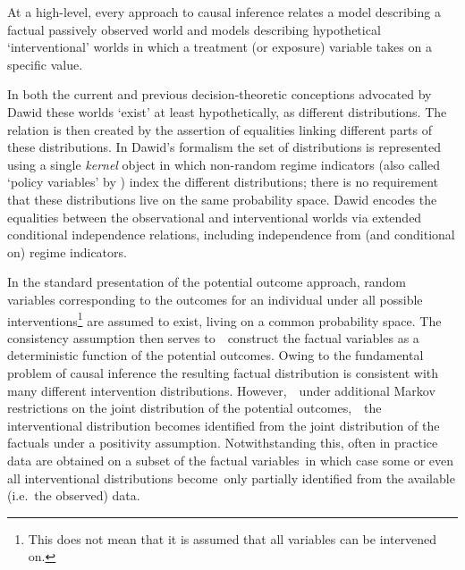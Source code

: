 \documentclass[11pt]{article}
\begin{document}
At a high-level, every approach to causal inference relates a model describing a factual passively observed world and models describing hypothetical `interventional' worlds in which a treatment (or exposure) variable takes on a specific value. 

In both the current and previous decision-theoretic conceptions advocated by Dawid these worlds `exist' at least hypothetically, as different distributions. The relation is then created by the assertion of equalities linking different parts of these distributions. In Dawid's formalism the  set of distributions is represented using a single {\it kernel} object in which non-random regime indicators (also called `policy variables' by \citet{sgs:1993}) index the different distributions; there is no requirement that these distributions live on the same probability space.
Dawid encodes the equalities between the observational and interventional worlds via extended conditional independence relations, including independence from (and conditional on) regime indicators.

In the standard presentation of the potential outcome approach, random variables corresponding to the outcomes for an individual under all possible interventions\footnote{This does not mean that it is assumed that all variables can be intervened on.} are assumed to exist, living on a common probability space. 
The consistency assumption then serves to  construct the factual variables as a deterministic function of the potential outcomes.
Owing to the fundamental problem of causal inference the resulting factual distribution is consistent with many different intervention distributions.
However,  under additional Markov restrictions on the joint distribution of the potential outcomes,  the interventional distribution becomes identified from the joint distribution of the factuals under a positivity assumption.
Notwithstanding this, often in practice data are obtained on a subset of the factual variables in which case some or even all interventional distributions become only partially identified from the available (i.e.~the observed) data.
\end{document}
